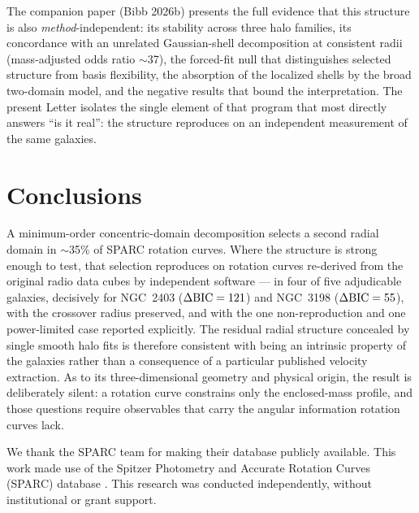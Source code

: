 \documentclass[twocolumn]{aastex701}
\newcommand{\dbic}{\Delta{\rm BIC}}
\begin{document}
The companion paper (Bibb 2026b) presents the full evidence that this structure is
also \emph{method}-independent: its stability across three halo families, its
concordance with an unrelated Gaussian-shell decomposition at consistent radii
(mass-adjusted odds ratio $\sim$37), the forced-fit null that distinguishes
selected structure from basis flexibility, the absorption of the localized shells
by the broad two-domain model, and the negative results that bound the
interpretation. The present Letter isolates the single element of that program
that most directly answers ``is it real'': the structure reproduces on an
independent measurement of the same galaxies.

\section{Conclusions} \label{sec:conclusions}

A minimum-order concentric-domain decomposition selects a second radial domain in
$\sim$35\% of SPARC rotation curves. Where the structure is strong enough to test,
that selection reproduces on rotation curves re-derived from the original radio
data cubes by independent software --- in four of five adjudicable galaxies,
decisively for NGC~2403 ($\dbic = 121$) and NGC~3198 ($\dbic = 55$), with the
crossover radius preserved, and with the one non-reproduction and one
power-limited case reported explicitly. The residual radial structure concealed by
single smooth halo fits is therefore consistent with being an intrinsic property of the
galaxies rather than a consequence of a particular published velocity extraction. As to its three-dimensional
geometry and physical origin, the result is deliberately silent: a rotation curve
constrains only the enclosed-mass profile, and those questions require observables
that carry the angular information rotation curves lack.

\begin{acknowledgments}
We thank the SPARC team for making their database publicly available. This work
made use of the Spitzer Photometry and Accurate Rotation Curves (SPARC) database
\citep{Lelli2016}. This research was conducted independently, without
institutional or grant support.
\end{acknowledgments}

\end{document}
